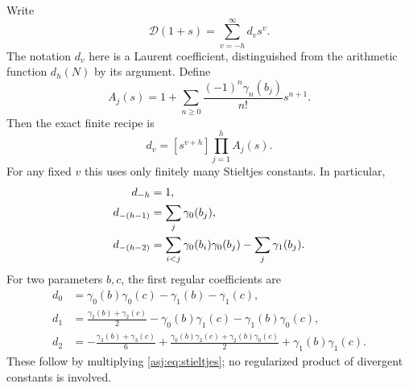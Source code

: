 \documentclass[11pt]{article}
\numberwithin{equation}{section}
\theoremstyle{definition}\newtheorem{definition}[theorem]{Definition}
\theoremstyle{remark}\newtheorem{remark}[theorem]{Remark}\newtheorem{example}[theorem]{Example}
\newcommand{\D}{\mathscr D}\newcommand{\calH}{\mathcal H}\newcommand{\calR}{\mathcal R}
\begin{document}
Write
\begin{equation}\label{asj:eq:dcoeff}
 \D(1+s)=\sum_{v=-h}^{\infty}d_v s^v.
\end{equation}
The notation $d_v$ here is a Laurent coefficient, distinguished from the
arithmetic function $d_h(N)$ by its argument. Define
\[
 A_j(s)=1+\sum_{n\ge0}\frac{(-1)^n\gamma_n(b_j)}{n!}s^{n+1}.
\]
Then the exact finite recipe is
\begin{equation}\label{asj:eq:drecipe}
 d_v=[s^{v+h}]\prod_{j=1}^h A_j(s).
\end{equation}
For any fixed $v$ this uses only finitely many Stieltjes constants. In
particular,
\begin{align}
 d_{-h}&=1,\notag\\
 d_{-(h-1)}&=\sum_j\gamma_0(b_j),\label{asj:eq:dleading}\\
 d_{-(h-2)}&=\sum_{i<j}\gamma_0(b_i)\gamma_0(b_j)
                   -\sum_j\gamma_1(b_j).\notag
\end{align}
For two parameters $b,c$, the first regular coefficients are
\begin{align}
 d_0&=\gamma_0(b)\gamma_0(c)-\gamma_1(b)-\gamma_1(c),\label{asj:eq:d0}\\
 d_1&=\frac{\gamma_2(b)+\gamma_2(c)}2
             -\gamma_0(b)\gamma_1(c)-\gamma_1(b)\gamma_0(c),\label{asj:eq:d1}\\
 d_2&=-\frac{\gamma_3(b)+\gamma_3(c)}6
      +\frac{\gamma_0(b)\gamma_2(c)+\gamma_2(b)\gamma_0(c)}2
      +\gamma_1(b)\gamma_1(c).\label{asj:eq:d2}
\end{align}
These follow by multiplying \eqref{asj:eq:stieltjes}; no regularized product
of divergent constants is involved.
\end{document}
